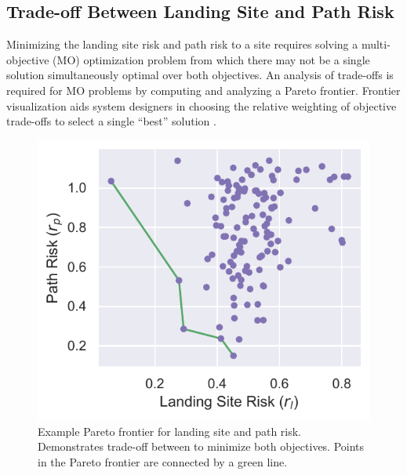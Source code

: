 \subsection{Trade-off Between Landing Site and Path Risk}\label{sec:ch5_trade-off}
Minimizing the landing site risk and path risk to a site requires solving a multi-objective (MO) optimization problem from which there may not be a single solution simultaneously optimal over both objectives. An analysis of trade-offs is required for MO problems by computing and analyzing a Pareto frontier. Frontier visualization aids system designers in choosing the relative weighting of objective trade-offs to select a single ``best'' solution \cite{ngatchou_pareto_2005}. 

\begin{figure}[h!]
\centering
\includegraphics[width=.5\linewidth]{chapter_5_mapping/imgs/witten_Scenario1_pareto.pdf}
\caption[Example Pareto frontier for landing site and path risk]{Example Pareto frontier for landing site and path risk. Demonstrates trade-off between to minimize both objectives. Points in the Pareto frontier are connected by a green line.}
\label{fig:ch5_pareto_example}
\end{figure}

